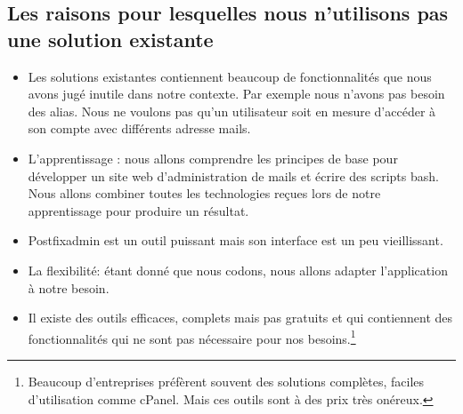 \documentclass[a4paper,12pt,french]{report} %
\begin{document}
\subsection*{Les raisons pour lesquelles nous n'utilisons pas une solution existante}
\begin{itemize}
\item Les solutions existantes contiennent beaucoup de fonctionnalités que nous avons jugé inutile dans notre contexte. Par exemple nous n'avons pas besoin des alias. Nous ne voulons pas qu'un utilisateur soit en mesure d'accéder à son compte avec différents adresse mails.
\item L'apprentissage : nous allons comprendre les principes de base pour développer un site web d'administration de mails et écrire des scripts bash. Nous allons combiner toutes les technologies reçues lors de notre apprentissage pour produire un résultat.
\item Postfixadmin est un outil puissant mais son interface est un peu vieillissant.
\item La flexibilité: étant donné que nous codons, nous allons adapter l'application à notre besoin.
\item Il existe des outils efficaces, complets mais pas gratuits et qui contiennent des fonctionnalités qui ne sont pas nécessaire pour nos besoins.\footnote{Beaucoup d'entreprises préfèrent souvent des solutions complètes, faciles d'utilisation comme cPanel. Mais ces outils sont à des prix très onéreux.}
\end{itemize}
\end{document}
